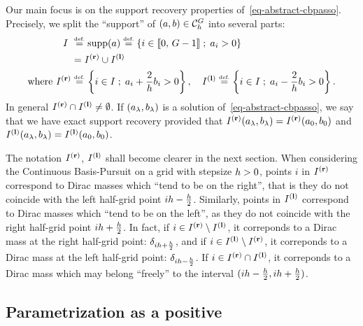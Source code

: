 Our main focus is on the support recovery properties of~\eqref{eq-abstract-cbpasso}. Precisely, we split the ``support'' of $(a,b)\in\mathcal{C}_h^G$ into several parts:
\begin{align}
  I~&\stackrel{\mbox{\upshape\tiny def.}}{=} \operatorname{supp}(a) \stackrel{\mbox{\upshape\tiny def.}}{=} \left\{ i \in \llbracket 0,\,G-1 \rrbracket \;;\; a_i > 0 \right\}\\
&={I^{\mathbf{(r)}}}\cup{I^{\mathbf{(l)}}}\\
\mbox{where } {I^{\mathbf{(r)}}} &\stackrel{\mbox{\upshape\tiny def.}}{=} \left\{ i\in I \;;\; a_i +\frac{2}{h}b_i >0  \right\},\quad 
	{I^{\mathbf{(l)}}} \stackrel{\mbox{\upshape\tiny def.}}{=} \left\{ i\in I \;;\; a_i -\frac{2}{h}b_i >0  \right\}.
\end{align}
In general ${I^{\mathbf{(r)}}}\cap {I^{\mathbf{(l)}}}\neq \emptyset$. If $(a_\lambda, b_\lambda)$ is a solution of~\eqref{eq-abstract-cbpasso}, we say that we have exact support recovery provided that ${I^{\mathbf{(r)}}}(a_\lambda, b_\lambda)= {I^{\mathbf{(r)}}}(a_0, b_0)$ and ${I^{\mathbf{(l)}}}(a_\lambda, b_\lambda)= {I^{\mathbf{(l)}}}(a_0, b_0)$. 

\begin{rem}
  The notation ${I^{\mathbf{(r)}}}$, ${I^{\mathbf{(l)}}}$ shall become clearer in the next section.
  When considering the Continuous Basis-Pursuit on a grid with stepsize $h>0$, points $i$ in ${I^{\mathbf{(r)}}}$ correspond to Dirac masses which ``tend to be on the right'', that is they do not coincide with the left half-grid point $ih-\frac{h}{2}$. Similarly, points in ${I^{\mathbf{(l)}}}$ correspond to Dirac masses which ``tend to be on the left'', as they do not coincide with the right half-grid point $ih+\frac{h}{2}$. In fact, if $i\in {I^{\mathbf{(r)}}}\setminus{I^{\mathbf{(l)}}}$, it correponds to a Dirac mass at the right half-grid point: $\delta_{ih+\frac{h}{2}}$, and if $i\in {I^{\mathbf{(l)}}}\setminus{I^{\mathbf{(r)}}}$, it correponds to a Dirac mass  at the left half-grid point: $\delta_{ih-\frac{h}{2}}$. If $i\in {I^{\mathbf{(r)}}}\cap {I^{\mathbf{(l)}}}$, it correponds to a Dirac mass which may belong ``freely'' to the interval $(ih-\frac{h}{2},ih+\frac{h}{2})$.  
\end{rem}


\subsection{Parametrization as a positive \protect\lasso }
\label{sec-cbp-another-param}

